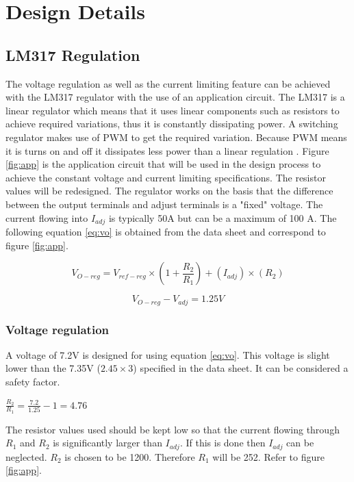 \chapter{Design Details}\label{Lit:desDetails}

\section{LM317 Regulation}
\label{sec:regulation}
The voltage regulation as well as the current limiting feature can be achieved with the LM317 regulator with the use of an application circuit. The LM317 is a linear regulator which means that it uses linear components such as resistors to achieve required variations, thus it is constantly dissipating power. A switching regulator makes use of PWM  to get the required variation. Because PWM means it is turns on and off it dissipates less power than a linear regulation \cite{SvsL}. Figure \ref{fig:app} is the application circuit that will be used in the design process to achieve the constant voltage and current limiting specifications. The resistor values will be redesigned. The regulator works on the basis that the difference between the output terminals and adjust terminals is a "fixed" voltage. The current flowing into $I_{adj}$ is typically 50\textmu{}A but can be a maximum of 100 \textmu{}A\cite{STM}.
The following equation \ref{eq:vo} is obtained from the data sheet \cite{STM} and correspond to figure  \ref{fig:app}.

\begin{equation}
    V_{O-reg}=V_{ref-reg}\times(1+\frac{R_2}{R_1})+(I_{adj})\times (R_2)
    \label{eq:vo}
\end{equation}

    \begin{equation}
         V_{O-reg}-V_{adj}=1.25V
         \label{eq:vref}
    \end{equation}

\subsection{Voltage regulation}
A voltage of 7.2V is designed for using equation \ref{eq:vo}. This voltage is slight lower than the 7.35V  ($2.45\times3$) specified in the data sheet. It can be considered a safety factor.  
\begin{center}
    $\frac{R_2}{R_1}=\frac{7.2}{1.25}-1=4.76$
\end{center}

The resistor values used should be kept low so that the current flowing through $R_1$ and $R_{2}$ is significantly larger than $I_{adj}$. If this is done then $I_{adj}$ can be neglected. $R_{2}$ is chosen to be 1200\textohm. Therefore $R_{1}$ will be 252\textohm. Refer to figure \ref{fig:app}.


